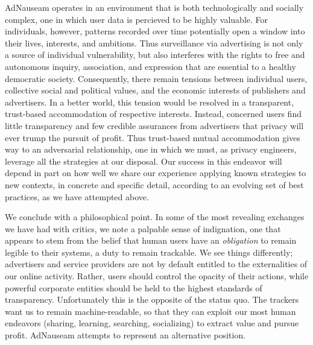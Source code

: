 \documentclass[conference]{IEEEtran}
\begin{document}
AdNauseam operates in an environment that is both technologically and socially complex, one in which user data is percieved to be highly valuable. For individuals, however, patterns recorded over time potentially open a window into their lives, interests, and ambitions. Thus surveillance via advertising is not only a source of individual vulnerability, but also interferes with the rights to free and autonomous inquiry, association, and expression that are essential to a healthy democratic society. Consequently, there remain tensions between individual users, collective social and political values, and the economic interests of publishers and advertisers. In a better world, this tension would be resolved in a transparent, trust-based accommodation of respective interests. Instead, concerned users find little transparency and few credible assurances from advertisers that privacy will ever trump the pursuit of profit. Thus trust-based mutual accommodation gives way to an adversarial relationship, one in which we must, as privacy engineers, leverage all the strategies at our disposal. Our success in this endeavor will depend in part on how well we share our experience applying known strategies to new contexts, in concrete and specific detail, according to an evolving set of best practices, as we have attempted above.

We conclude with a philosophical point. In some of the most revealing exchanges we have had with critics, we note a palpable sense of indignation, one that appears to stem from the belief that human users have an \emph{obligation} to remain legible to their systems, a duty to remain trackable. We see things differently; advertisers and service providers are not by default entitled to the externalities of our online activity. Rather, users should control the opacity of their actions, while powerful corporate entities should be held to the highest standards of transparency. Unfortunately this is the opposite of the status quo. The trackers want us to remain machine-readable, so that they can exploit our most human endeavors (sharing, learning, searching, socializing) to extract value and pursue profit. AdNauseam attempts to represent an alternative position.
\end{document}
